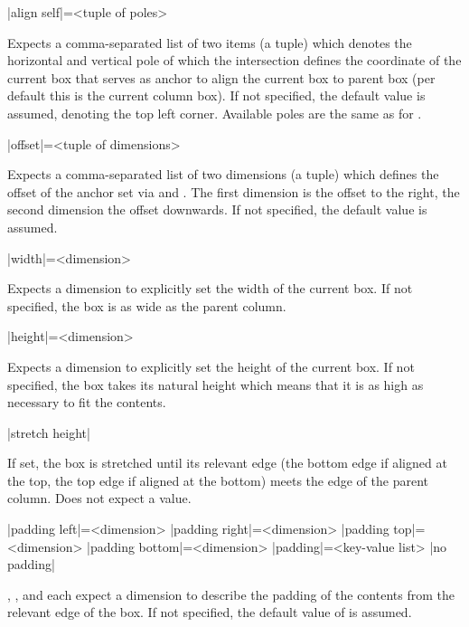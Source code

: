 \documentclass[a4paper]{article}
\begin{document}
\begin{macrodef}
|align self|={<tuple of poles>}
\end{macrodef}
Expects a comma-separated list of two items (a tuple) which denotes the horizontal and vertical pole of which the intersection defines the coordinate of the current box that serves as anchor to align the current box to parent box (per default this is the current column box). If not specified, the default value  is assumed, denoting the top left corner. Available poles are the same as for .

\begin{macrodef}
|offset|={<tuple of dimensions>}
\end{macrodef}
Expects a comma-separated list of two dimensions (a tuple) which defines the offset of the anchor set via  and . The first dimension is the offset to the right, the second dimension the offset downwards. If not specified, the default value \macro{0mm, 0mm} is assumed.

\begin{macrodef}
|width|={<dimension>}
\end{macrodef}
Expects a dimension to explicitly set the width of the current box. If not specified, the box is as wide as the parent column.

\begin{macrodef}
|height|={<dimension>}
\end{macrodef}
Expects a dimension to explicitly set the height of the current box. If not specified, the box takes its natural height which means that it is as high as necessary to fit the contents.

\begin{macrodef}
|stretch height|
\end{macrodef}
If set, the box is stretched until its relevant edge (the bottom edge if aligned at the top, the top edge if aligned at the bottom) meets the edge of the parent column. Does not expect a value.

\begin{macrodef}
|padding left|={<dimension>}
|padding right|={<dimension>}
|padding top|={<dimension>}
|padding bottom|={<dimension>}
|padding|={<key-value list>}
|no padding|
\end{macrodef}
, ,  and  each expect a dimension to describe the padding of the contents from the relevant edge of the box. If not specified, the default value of \macro{7.5mm} is assumed.
\end{document}
